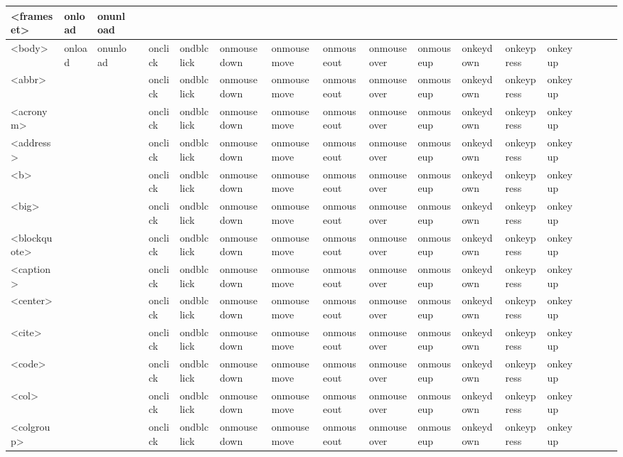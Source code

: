 \begin{center}
\begin{landscape}
\begin{longtable}{|l|l|l|l|l|l|l|l|l|l|l|l|l|l|l|l|l|l|}
\hline
<frameset>	& onload	& onunload &	&& 		&  &  &  &  &  &  &  &  &  & & & \\				
\hline													
<body>		& onload	& onunload &	&onclick	& ondblclick & onmousedown & onmousemove & onmouseout & onmouseover & onmouseup & onkeydown & onkeypress & onkeyup & & & & \\ 		
\hline
<abbr>		&	&	&	& onclick	& ondblclick & onmousedown & onmousemove & onmouseout & onmouseover & onmouseup & onkeydown & onkeypress & onkeyup & & & & \\				
\hline
<acronym>	&	&	&	& onclick	& ondblclick & onmousedown & onmousemove & onmouseout & onmouseover & onmouseup & onkeydown & onkeypress & onkeyup & & & & \\				
\hline
<address>	&	&	&	& onclick	& ondblclick & onmousedown & onmousemove & onmouseout & onmouseover & onmouseup & onkeydown & onkeypress & onkeyup & & & & \\				
\hline
<b>			&	&	&	& onclick	& ondblclick & onmousedown & onmousemove & onmouseout & onmouseover & onmouseup & onkeydown & onkeypress & onkeyup & & & & \\
\hline
<big>		&	&	&	& onclick	& ondblclick & onmousedown & onmousemove & onmouseout & onmouseover & onmouseup & onkeydown & onkeypress & onkeyup & & & & \\
\hline
<blockquote>	&	&	&	& onclick	& ondblclick & onmousedown & onmousemove & onmouseout & onmouseover & onmouseup & onkeydown & onkeypress & onkeyup & & & & \\
\hline
<caption>		&	&	&	& onclick	& ondblclick & onmousedown & onmousemove & onmouseout & onmouseover & onmouseup & onkeydown & onkeypress & onkeyup & & & & \\
\hline
<center>		&	&	&	& onclick	& ondblclick & onmousedown & onmousemove & onmouseout & onmouseover & onmouseup & onkeydown & onkeypress & onkeyup & & & & \\
\hline
<cite>		&	&	&	& onclick	& ondblclick & onmousedown & onmousemove & onmouseout & onmouseover & onmouseup & onkeydown & onkeypress & onkeyup & & & & \\
\hline
<code>		&	&	&	& onclick	& ondblclick & onmousedown & onmousemove & onmouseout & onmouseover & onmouseup & onkeydown & onkeypress & onkeyup & & & & \\
\hline
<col>		&	&	&	& onclick	& ondblclick & onmousedown & onmousemove & onmouseout & onmouseover & onmouseup & onkeydown & onkeypress & onkeyup & & & & \\
\hline
<colgroup>	&	&	&	& onclick	& ondblclick & onmousedown & onmousemove & onmouseout & onmouseover & onmouseup & onkeydown & onkeypress & onkeyup & & & & \\

\end{longtable}
\end{landscape}
\end{center}
